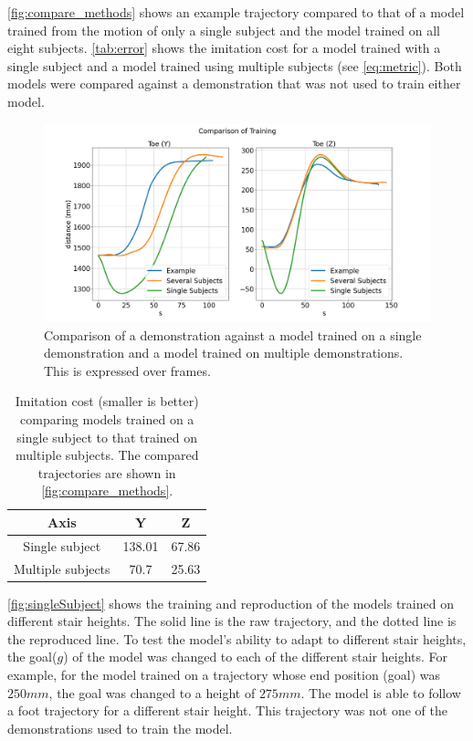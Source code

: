 \autoref{fig:compare_methods} shows an example trajectory compared to that of a model trained from the motion of only a single subject and the model trained on all eight subjects. \autoref{tab:error} shows the imitation cost for a model trained with a single subject and a model trained using multiple subjects (see \autoref{eq:metric}). Both models were compared against a demonstration that was not used to train either model.  



\begin{figure}[h]
    \centering 
    \includegraphics[scale=0.20]{images/compare_method.png} 
    \caption{Comparison of a demonstration against a model trained on a single demonstration and a model trained on multiple demonstrations. This is expressed over frames. } 
    \label{fig:compare_methods} 
\end{figure} 

\begin{table}[h]
\large 
     \centering 
     \begin{tabular}{||c|| c c ||}  
     \hline 
         Axis     & Y & Z  \\ [0.5ex]  
         \hline\hline 
         Single subject   & 138.01 & 67.86  \\  
         \hline 
         Multiple subjects & 70.7 & 25.63  \\ 
         \hline      
     \end{tabular} 
     \caption{Imitation cost (smaller is better) comparing models trained on a single subject to that trained on multiple subjects. The compared trajectories are shown in \autoref{fig:compare_methods}. } 
     \label{tab:error} 
\end{table} 


\autoref{fig:singleSubject} shows the training and reproduction of the models trained on different stair heights. The solid line is the raw trajectory, and the dotted line is the reproduced line. To test the model's ability to adapt to different stair heights, the goal($g$) of the model was changed to each of the different stair heights. For example, for the model trained on a trajectory whose end position (goal) was $250mm$, the goal was changed to a height of $275mm$. The model is able to follow a foot trajectory for a different stair height. This trajectory was not one of the demonstrations used to train the model.


